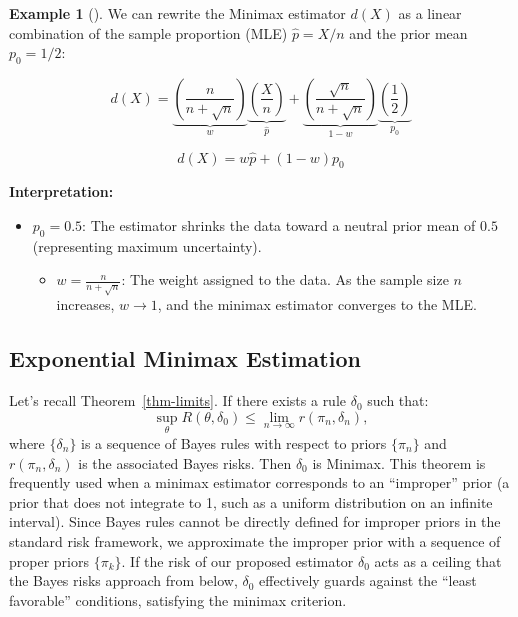 \documentclass[
  letterpaper,
  DIV=11,
  numbers=noendperiod]{scrreprt}
\providecommand{\tightlist}{%
  \setlength{\itemsep}{0pt}\setlength{\parskip}{0pt}}
\renewcommand{\[}{\begin{equation}}
\renewcommand{\]}{\end{equation}}
\theoremstyle{definition}
\theoremstyle{plain}
\theoremstyle{plain}
\theoremstyle{plain}
\theoremstyle{definition}
\newtheorem{example}{Example}[chapter]
\theoremstyle{plain}
\theoremstyle{remark}
\begin{document}
\begin{example}[]
We can rewrite the Minimax estimator \(d(X)\) as a linear combination of
the sample proportion (MLE) \(\hat{p} = X/n\) and the prior mean
\(p_0 = 1/2\):

\[
d(X) = \underbrace{\left( \frac{n}{n + \sqrt{n}} \right)}_{w} \underbrace{\left( \frac{X}{n} \right)}_{\hat{p}} + \underbrace{\left( \frac{\sqrt{n}}{n + \sqrt{n}} \right)}_{1-w} \underbrace{\left( \frac{1}{2} \right)}_{p_0}
\]

\[
d(X) = w \hat{p} + (1-w) p_0
\]

\textbf{Interpretation:}

\begin{itemize}
\tightlist
\item
  \textbf{\(p_0 = 0.5\)}: The estimator shrinks the data toward a
  neutral prior mean of \(0.5\) (representing maximum uncertainty).

  \begin{itemize}
  \tightlist
  \item
    \textbf{\(w = \frac{n}{n+\sqrt{n}}\)}: The weight assigned to the
    data. As the sample size \(n\) increases, \(w \to 1\), and the
    minimax estimator converges to the MLE.
  \end{itemize}
\end{itemize}

\end{example}

\subsection{Exponential Minimax
Estimation}\label{exponential-minimax-estimation}

Let's recall Theorem~\ref{thm-limits}. If there exists a rule
\(\delta_0\) such that: \[
\sup_{\theta} R(\theta, \delta_0) \le \lim_{n \to \infty} r(\pi_n, \delta_n),
\] where \(\{\delta_n\}\) is a sequence of Bayes rules with respect to
priors \(\{\pi_n\}\) and \(r(\pi_n, \delta_n)\) is the associated Bayes
risks. Then \(\delta_0\) is Minimax. This theorem is frequently used
when a minimax estimator corresponds to an ``improper'' prior (a prior
that does not integrate to 1, such as a uniform distribution on an
infinite interval). Since Bayes rules cannot be directly defined for
improper priors in the standard risk framework, we approximate the
improper prior with a sequence of proper priors \(\{\pi_k\}\). If the
risk of our proposed estimator \(\delta_0\) acts as a ceiling that the
Bayes risks approach from below, \(\delta_0\) effectively guards against
the ``least favorable'' conditions, satisfying the minimax criterion.
\end{document}
